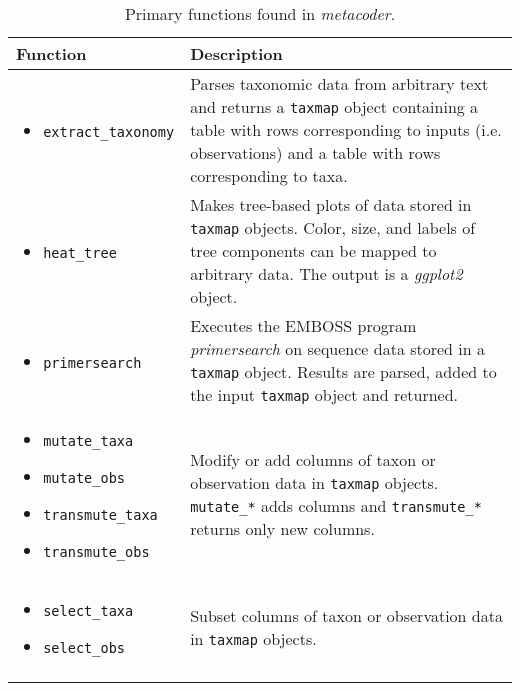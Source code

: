 \documentclass[10pt,letterpaper]{article}
\begin{document}
\begin{table}
\caption{{\label{tab:table1} Primary functions found in \textit{metacoder}.}}
\begin{tabular}[t]{p{5cm}  p{10cm}}
\hline{\textbf{Function}}      & \textbf{Description}    \\
\hline
\begin{itemize}
\item \texttt{extract\_taxonomy}
\end{itemize} & Parses taxonomic data from arbitrary text and returns a \texttt{taxmap} object containing a table with rows corresponding to inputs (i.e. observations) and a table with rows corresponding to taxa.       \\
\hline
\begin{itemize}
\item \texttt{heat\_tree}
\end{itemize} & Makes tree-based plots of data stored in \texttt{taxmap} objects. Color, size, and labels of tree components can be mapped to arbitrary data. The output is a \textit{ggplot2} object.     \\
\hline
\begin{itemize}
\item \texttt{primersearch}
\end{itemize} & Executes the EMBOSS program \textit{primersearch} on sequence data stored in a \texttt{taxmap} object. Results are parsed, added to the input \texttt{taxmap} object and returned.                       \\
\hline
\begin{itemize}
\item \texttt{mutate\_taxa}
\item \texttt{mutate\_obs}
\item \texttt{transmute\_taxa}
\item \texttt{transmute\_obs}
\end{itemize} & Modify or add columns of taxon or observation data in \texttt{taxmap} objects. \texttt{mutate\_*} adds columns and \texttt{transmute\_*} returns only new columns. \\
\hline
\begin{itemize}
\item \texttt{select\_taxa}
\item \texttt{select\_obs}
\end{itemize} & Subset columns of taxon or observation data in \texttt{taxmap} objects.         \\
\hline
\begin{itemize}

\end{itemize}
\end{tabular}
\end{table}
\end{document}
